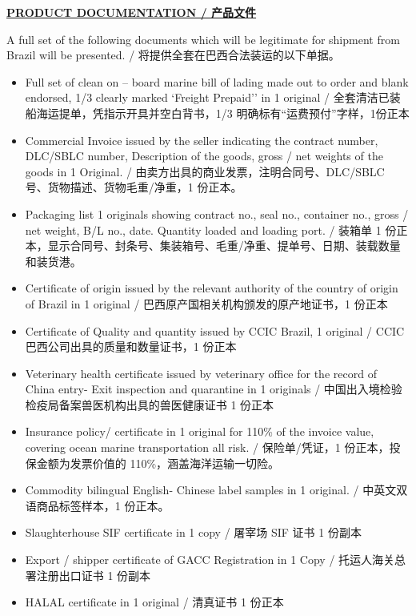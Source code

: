 \documentclass[a4paper,11pt]{article}
\begin{document}
\begin{center}{\large\textbf{\underline{\color{marooncolor}PRODUCT DOCUMENTATION / 产品文件}}}\end{center}
\vspace{0.2cm}
\noindent A full set of the following documents which will be legitimate for shipment from Brazil will be presented. / 将提供全套在巴西合法装运的以下单据。
\vspace{0.1cm}
\begin{itemize}[leftmargin=1.5em, itemsep=3pt, topsep=2pt]
\item Full set of clean on -- board marine bill of lading made out to order and blank endorsed, 1/3 clearly marked `Freight Prepaid'' in 1 original / 全套清洁已装船海运提单，凭指示开具并空白背书，1/3 明确标有“运费预付”字样，1份正本
\item Commercial Invoice issued by the seller indicating the contract number, DLC/SBLC number, Description of the goods, gross / net weights of the goods in 1 Original. / 由卖方出具的商业发票，注明合同号、DLC/SBLC 号、货物描述、货物毛重/净重，1 份正本。
\item Packaging list 1 originals showing contract no., seal no., container no., gross / net weight, B/L no., date. Quantity loaded and loading port. / 装箱单 1 份正本，显示合同号、封条号、集装箱号、毛重/净重、提单号、日期、装载数量和装货港。
\item Certificate of origin issued by the relevant authority of the country of origin of Brazil in 1 original / 巴西原产国相关机构颁发的原产地证书，1 份正本
\item Certificate of Quality and quantity issued by CCIC Brazil, 1 original / CCIC 巴西公司出具的质量和数量证书，1 份正本
\item Veterinary health certificate issued by veterinary office for the record of China entry- Exit inspection and quarantine in 1 originals / 中国出入境检验检疫局备案兽医机构出具的兽医健康证书 1 份正本
\item Insurance policy/ certificate in 1 original for 110\% of the invoice value, covering ocean marine transportation all risk. / 保险单/凭证，1 份正本，投保金额为发票价值的 110\%，涵盖海洋运输一切险。
\item Commodity bilingual English- Chinese label samples in 1 original. / 中英文双语商品标签样本，1 份正本。
\item Slaughterhouse SIF certificate in 1 copy / 屠宰场 SIF 证书 1 份副本
\item Export / shipper certificate of GACC Registration in 1 Copy / 托运人海关总署注册出口证书 1 份副本
\item HALAL certificate in 1 original / 清真证书 1 份正本
\end{itemize}
\end{document}
